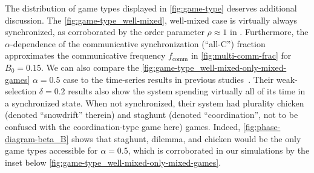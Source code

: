 \documentclass[pdflatex,lineno,referee,sn-nature]{sn-jnl}
\begin{document}
The distribution of game types displayed in \cref{fig:game-type}
deserves additional discussion.
The \cref{fig:game-type_well-mixed},
well-mixed case
is virtually always synchronized,
as corroborated by the order parameter $\rho \approx 1$ in
.
Furthermore,
the $\alpha$-dependence of the
communicative synchronization (``all-C'') fraction
approximates the communicative frequency $f_{\text{comm}}$
in \cref{fig:multi-comm-frac} for $B_0=0.15$.
We can also compare the \cref{fig:game-type_well-mixed-only-mixed-games}
$\alpha = 0.5$ case
to the time-series results
in previous studies~\citep{tripp2022evolutionary}.
Their weak-selection $\delta = 0.2$
results also show the system spending
virtually all of its time in a synchronized state.
When not synchronized, their system had plurality
chicken (denoted ``snowdrift'' therein)
and staghunt (denoted ``coordination'',
not to be confused with the coordination-type game here) games.
Indeed, \cref{fig:phase-diagram-beta_B}
shows that staghunt, dilemma, and chicken
would be the only game types accessible for $\alpha = 0.5$,
which is corroborated in our simulations by the inset below
\cref{fig:game-type_well-mixed-only-mixed-games}.
\end{document}
